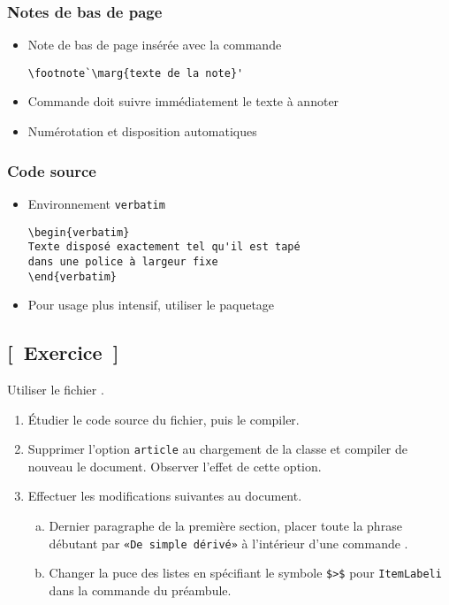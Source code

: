 \begin{frame}[fragile]
  \frametitle{Notes de bas de page}
  \begin{itemize}
  \item Note de bas de page insérée avec la commande
\begin{lstlisting}
\footnote`\marg{texte de la note}'
\end{lstlisting}
  \item Commande doit suivre immédiatement le texte à annoter
  \item Numérotation et disposition automatiques
  \end{itemize}
\end{frame}

\begin{frame}[fragile=singleslide]
  \frametitle{Code source}
  \begin{itemize}
  \item Environnement \texttt{verbatim}
\begin{lstlisting}
\begin{verbatim}
Texte disposé exactement tel qu'il est tapé
dans une police à largeur fixe
\end{verbatim}
\end{lstlisting}
  \item Pour usage plus intensif, utiliser le paquetage 
  \end{itemize}
\end{frame}

\subsection{[~Exercice~]}

\begin{exercice}
  Utiliser le fichier .

  \begin{enumerate}
  \item Étudier le code source du fichier, puis le compiler.
  \item Supprimer l'option \texttt{article} au chargement de la classe
    et compiler de nouveau le document. Observer l'effet de cette
    option.
  \item Effectuer les modifications suivantes au document.
    \begin{enumerate}[a)]
    \item Dernier paragraphe de la première section, placer toute la
      phrase débutant par \texttt{«De simple dérivé»} à l'intérieur
      d'une commande .
    \item Changer la puce des listes en spécifiant le symbole
      \texttt{\$>\$} pour \texttt{ItemLabeli} dans la commande
       du préambule.
    \end{enumerate}
  \end{enumerate}
\end{exercice}

